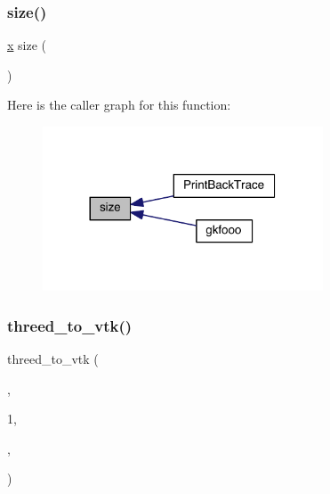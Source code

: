 \mbox{\label{a00611_ad6cb0afbbe6ea4f56407890be2533966}} 
\subsubsection{\texorpdfstring{size()}{size()}}
{\footnotesize\ttfamily \hyperlink{a00605_ac98c3bb25378222646e977292011625f}{x} size (\begin{DoxyParamCaption}{ }\end{DoxyParamCaption})\hspace{0.3cm}{\ttfamily [virtual]}}

Here is the caller graph for this function\+:\nopagebreak
\begin{figure}[H]
\begin{center}
\leavevmode
\includegraphics[width=236pt]{a00611_ad6cb0afbbe6ea4f56407890be2533966_icgraph}
\end{center}
\end{figure}
\mbox{\label{a00611_a66abe865455373ad07c84e89b14fe7ee}} 
\subsubsection{\texorpdfstring{threed\+\_\+to\+\_\+vtk()}{threed\_to\_vtk()}}
{\footnotesize\ttfamily threed\+\_\+to\+\_\+vtk (\begin{DoxyParamCaption}\item[{\hyperlink{a00605_a28010846a3742b3c2c07f00b1f1536ff}{N\+O\+DE}(\+:, 1\+:3)}]{,  }\item[{\hyperlink{a00608_ada37e689768b959686f183a3d534464b}{I\+EN}\textquotesingle{}+}]{1,  }\item[{\textquotesingle{}bike/bike.\+vtk\textquotesingle{}}]{,  }\item[{\textquotesingle{}Bike Displacement Data\textquotesingle{}}]{ }\end{DoxyParamCaption})}

